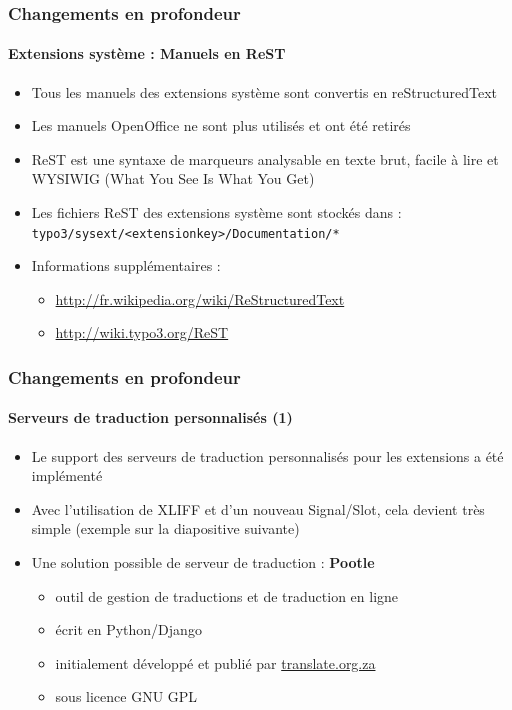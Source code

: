 \begin{frame}[fragile]
	\frametitle{Changements en profondeur}
	\framesubtitle{Extensions système : Manuels en ReST}

	\begin{itemize}
		\item Tous les manuels des extensions système sont convertis en reStructuredText
		\item Les manuels OpenOffice ne sont plus utilisés et ont été retirés
		\item ReST est une syntaxe de marqueurs analysable en texte brut, facile à lire et WYSIWIG (What You See Is What You Get)
		\item Les fichiers ReST des extensions système sont stockés dans :\newline
			\texttt{typo3/sysext/<extensionkey>/Documentation/*}

		\item Informations supplémentaires :

			\begin{itemize}
				\item \url{http://fr.wikipedia.org/wiki/ReStructuredText}
				\item \url{http://wiki.typo3.org/ReST}
			\end{itemize}

	\end{itemize}

\end{frame}


\begin{frame}[fragile]
	\frametitle{Changements en profondeur}
	\framesubtitle{Serveurs de traduction personnalisés (1)}

	\begin{itemize}
		\item Le support des serveurs de traduction personnalisés pour les extensions a été implémenté
		\item Avec l'utilisation de XLIFF et d'un nouveau Signal/Slot,\newline
			cela devient très simple (exemple sur la diapositive suivante)
		\item Une solution possible de serveur de traduction : \textbf{Pootle}

			\begin{itemize}
				\item outil de gestion de traductions et de traduction en ligne
				\item écrit en Python/Django
				\item initialement développé et publié par \url{translate.org.za}
				\item sous licence GNU GPL
			\end{itemize}

	\end{itemize}

\end{frame}

